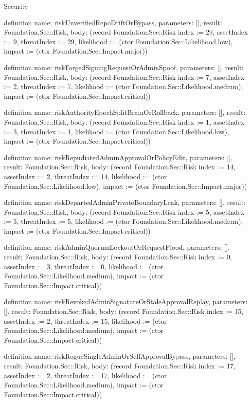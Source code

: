 \begin{lexlean}{Security}
\begin{semanticmodule}
definition{
  name: riskUnverifiedRepoDriftOrBypass,
  parameters: [],
  result: Foundation.Sec::Risk,
  body: (record Foundation.Sec::Risk {index := 29, assetIndex := 9, threatIndex := 29, likelihood := (ctor Foundation.Sec::Likelihood.low), impact := (ctor Foundation.Sec::Impact.major)})
}

definition{
  name: riskForgedSigningRequestOrAdminSpoof,
  parameters: [],
  result: Foundation.Sec::Risk,
  body: (record Foundation.Sec::Risk {index := 7, assetIndex := 2, threatIndex := 7, likelihood := (ctor Foundation.Sec::Likelihood.medium), impact := (ctor Foundation.Sec::Impact.critical)})
}

definition{
  name: riskAuthorityEpochSplitBrainOrRollback,
  parameters: [],
  result: Foundation.Sec::Risk,
  body: (record Foundation.Sec::Risk {index := 1, assetIndex := 3, threatIndex := 1, likelihood := (ctor Foundation.Sec::Likelihood.low), impact := (ctor Foundation.Sec::Impact.critical)})
}

definition{
  name: riskRepudiatedAdminApprovalOrPolicyEdit,
  parameters: [],
  result: Foundation.Sec::Risk,
  body: (record Foundation.Sec::Risk {index := 14, assetIndex := 2, threatIndex := 14, likelihood := (ctor Foundation.Sec::Likelihood.low), impact := (ctor Foundation.Sec::Impact.major)})
}

definition{
  name: riskDepartedAdminPrivateBoundaryLeak,
  parameters: [],
  result: Foundation.Sec::Risk,
  body: (record Foundation.Sec::Risk {index := 5, assetIndex := 3, threatIndex := 5, likelihood := (ctor Foundation.Sec::Likelihood.medium), impact := (ctor Foundation.Sec::Impact.critical)})
}

definition{
  name: riskAdminQuorumLockoutOrRequestFlood,
  parameters: [],
  result: Foundation.Sec::Risk,
  body: (record Foundation.Sec::Risk {index := 0, assetIndex := 3, threatIndex := 0, likelihood := (ctor Foundation.Sec::Likelihood.medium), impact := (ctor Foundation.Sec::Impact.critical)})
}

definition{
  name: riskRevokedAdminSignatureOrStaleApprovalReplay,
  parameters: [],
  result: Foundation.Sec::Risk,
  body: (record Foundation.Sec::Risk {index := 15, assetIndex := 2, threatIndex := 15, likelihood := (ctor Foundation.Sec::Likelihood.medium), impact := (ctor Foundation.Sec::Impact.critical)})
}

definition{
  name: riskRogueSingleAdminOrSelfApprovalBypass,
  parameters: [],
  result: Foundation.Sec::Risk,
  body: (record Foundation.Sec::Risk {index := 17, assetIndex := 2, threatIndex := 17, likelihood := (ctor Foundation.Sec::Likelihood.medium), impact := (ctor Foundation.Sec::Impact.critical)})
}


\end{semanticmodule}
\end{lexlean}
